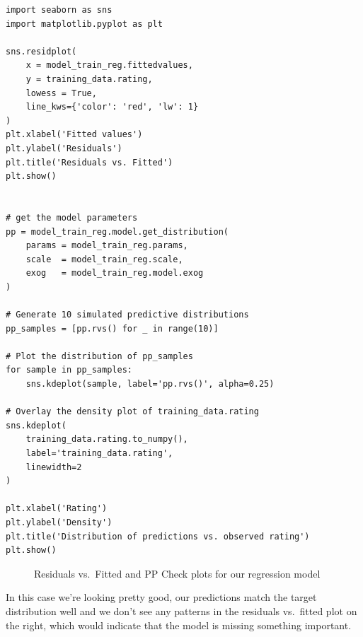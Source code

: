 \documentclass[
  letterpaper,
]{krantz}
\begin{document}
\begin{verbatim}
import seaborn as sns
import matplotlib.pyplot as plt

sns.residplot(
    x = model_train_reg.fittedvalues, 
    y = training_data.rating, 
    lowess = True, 
    line_kws={'color': 'red', 'lw': 1}
)
plt.xlabel('Fitted values')
plt.ylabel('Residuals')
plt.title('Residuals vs. Fitted')
plt.show()


# get the model parameters
pp = model_train_reg.model.get_distribution(
    params = model_train_reg.params, 
    scale  = model_train_reg.scale, 
    exog   = model_train_reg.model.exog
)

# Generate 10 simulated predictive distributions
pp_samples = [pp.rvs() for _ in range(10)]

# Plot the distribution of pp_samples
for sample in pp_samples:
    sns.kdeplot(sample, label='pp.rvs()', alpha=0.25)

# Overlay the density plot of training_data.rating
sns.kdeplot(
    training_data.rating.to_numpy(), 
    label='training_data.rating', 
    linewidth=2
)

plt.xlabel('Rating')
plt.ylabel('Density')
plt.title('Distribution of predictions vs. observed rating')
plt.show()
\end{verbatim}

\begin{figure}[H]


\caption{\label{fig-regression-visualize}Residuals vs.~Fitted and PP
Check plots for our regression model}

\end{figure}%

In this case we're looking pretty good, our predictions match the target
distribution well and we don't see any patterns in the residuals
vs.~fitted plot on the right, which would indicate that the model is
missing something important.
\end{document}
